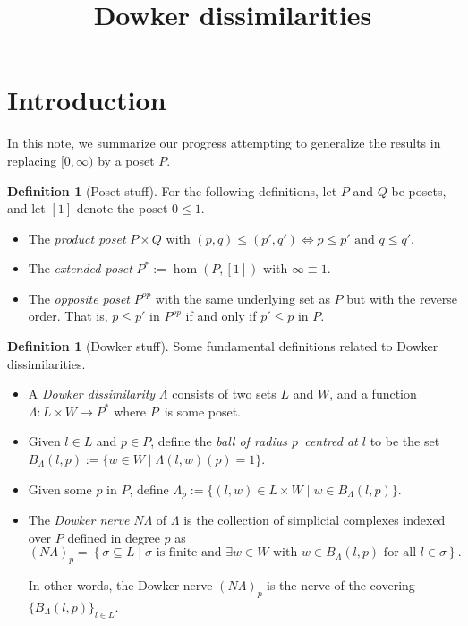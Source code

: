 \documentclass[10pt,a4paper]{article}
\title{Dowker dissimilarities}
\theoremstyle{definition}
\newtheorem{defn}[thm]{Definition}
\begin{document}
\maketitle

\section{Introduction}

In this note, we summarize our progress attempting to generalize the results in \autocite{blaser2019sparse} replacing $[0,\infty)$ by a poset $P$.

\begin{defn}[Poset stuff]
	For the following definitions, let $P$ and $Q$ be posets, and let $[1]$ denote the poset $0\leq 1$.
	\begin{itemize}
		\item The \textit{product poset} $P\times Q$ with $(p,q)\leq(p',q')\iff p\leq p'\text{ and }q\leq q'$.
		
		\item The \textit{extended poset} $P^*:=\hom(P,[1])$ with $\infty \equiv 1$.
		
		\item The \textit{opposite poset} $P^{op}$ with the same underlying set as $P$ but with the reverse order. That is, $p\leq p'$ in $P^{op}$ if and only if $p'\leq p$ in $P$.
	\end{itemize}
\end{defn} 

\begin{defn}[Dowker stuff]
	Some fundamental definitions related to Dowker dissimilarities.
	\begin{itemize}
		\item A \textit{Dowker dissimilarity} $\Lambda$ consists of two sets $L$ and $W$, and a function $\Lambda\colon L\times W\to P^*$ where $P$ is some poset.
		
		\item Given $l\in L$ and $p\in P$, define the \textit{ball of radius $p$ centred at $l$} to be the set $B_\Lambda(l,p):=\{w\in W\mid\Lambda(l,w)(p)=1\}$. 
		
		\item Given some $p$ in $P$, define $\Lambda_p:=\{(l,w)\in L\times W\mid w\in B_\Lambda(l,p)\}$.
		
		\item The \textit{Dowker nerve} $N\Lambda$ of $\Lambda$ is the collection of simplicial complexes indexed over $P$ defined in degree $p$ as 
		$$
		(N\Lambda)_{p} = \left\{\sigma\subseteq L\mid\sigma\text{ is finite and } \exists w\in W \text{ with } w\in B_\Lambda(l,p)\text{ for all }l\in\sigma \right\}.
		$$
		
		In other words, the Dowker nerve $(N\Lambda)_p$ is the nerve of the covering $\{B_\Lambda(l,p)\}_{l\in L}$.
	\end{itemize}
\end{defn} 
\end{document}

